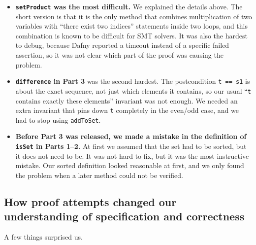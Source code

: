 \documentclass[11pt,a4paper]{article}
\begin{document}
\begin{itemize}
  \item \textbf{\texttt{setProduct} was the most difficult.} We explained the details above. The short version is that it is the only method that combines multiplication of two variables with ``there exist two indices'' statements inside two loops, and this combination is known to be difficult for SMT solvers. It was also the hardest to debug, because Dafny reported a timeout instead of a specific failed assertion, so it was not clear which part of the proof was causing the problem.
  \item \textbf{\texttt{difference} in Part 3} was the second hardest. The postcondition \texttt{t == s1} is about the exact sequence, not just which elements it contains, so our usual ``\texttt{t} contains exactly these elements'' invariant was not enough. We needed an extra invariant that pins down \texttt{t} completely in the even/odd case, and we had to stop using \texttt{addToSet}.
  \item \textbf{Before Part 3 was released, we made a mistake in the definition of \texttt{isSet} in Parts 1--2.} At first we assumed that the set had to be sorted, but it does not need to be. It was not hard to fix, but it was the most instructive mistake. Our sorted definition looked reasonable at first, and we only found the problem when a later method could not be verified.
\end{itemize}

\subsection{How proof attempts changed our understanding of specification and correctness}

A few things surprised us.
\end{document}
